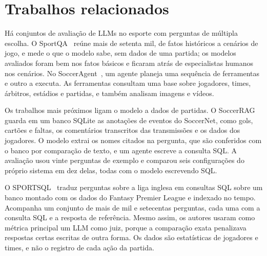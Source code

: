 %

\section{Trabalhos relacionados}\label{sec:trabalhos}

Há conjuntos de avaliação de LLMs no esporte com perguntas de múltipla escolha. O
SportQA~\cite{xia2024sportqa} reúne mais de setenta mil, de fatos históricos a cenários de jogo, e mede o que o
modelo sabe, sem dados de uma partida; os modelos avaliados foram bem nos fatos básicos e ficaram atrás de
especialistas humanos nos cenários. No SoccerAgent~\cite{rao2025socceragent}, um agente planeja uma sequência de
ferramentas e outro a executa. As ferramentas consultam uma base sobre jogadores, times, árbitros, estádios e
partidas, e também analisam imagens e vídeos.

Os trabalhos mais próximos ligam o modelo a dados de partidas. O SoccerRAG~\cite{strand2024soccerrag} guarda em
um banco SQLite as anotações de eventos do SoccerNet, como gols, cartões e faltas, os comentários transcritos das
transmissões e os dados dos jogadores. O modelo extrai os nomes citados na pergunta, que são conferidos com o banco
por comparação de texto, e um agente escreve a consulta SQL. A avaliação usou vinte perguntas de exemplo e comparou seis configurações do próprio sistema em
dez delas, todas com o modelo escrevendo SQL.

O SPORTSQL~\cite{martinez2025sportsql} traduz perguntas sobre a liga inglesa em consultas SQL sobre um banco
montado com os dados do Fantasy Premier League e indexado no tempo. Acompanha um conjunto de mais de mil e
setecentas perguntas, cada uma com a consulta SQL e a resposta de referência. Mesmo assim, os autores usaram como
métrica principal um LLM como juiz, porque a comparação exata penalizava respostas certas escritas de outra forma.
Os dados são estatísticas de jogadores e times, e não o registro de cada ação da partida.

